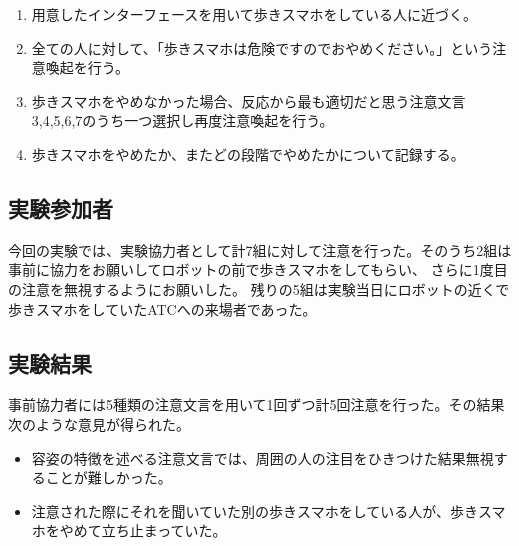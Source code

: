 \documentclass{kuisthesis}
\begin{document}
\begin{enumerate}
  \item 用意したインターフェースを用いて歩きスマホをしている人に近づく。
  \item 全ての人に対して、「歩きスマホは危険ですのでおやめください。」という注意喚起を行う。
  \item 歩きスマホをやめなかった場合、反応から最も適切だと思う注意文言3,4,5,6,7のうち一つ選択し再度注意喚起を行う。
  \item 歩きスマホをやめたか、またどの段階でやめたかについて記録する。
\end{enumerate}

\subsection{実験参加者}
今回の実験では、実験協力者として計7組に対して注意を行った。そのうち2組は事前に協力をお願いしてロボットの前で歩きスマホをしてもらい、
さらに1度目の注意を無視するようにお願いした。
残りの5組は実験当日にロボットの近くで歩きスマホをしていたATCへの来場者であった。
\subsection{実験結果}
事前協力者には5種類の注意文言を用いて1回ずつ計5回注意を行った。その結果次のような意見が得られた。
\begin{itemize}
  \item 容姿の特徴を述べる注意文言では、周囲の人の注目をひきつけた結果無視することが難しかった。
  \item 注意された際にそれを聞いていた別の歩きスマホをしている人が、歩きスマホをやめて立ち止まっていた。
\end{itemize}
\end{document}
